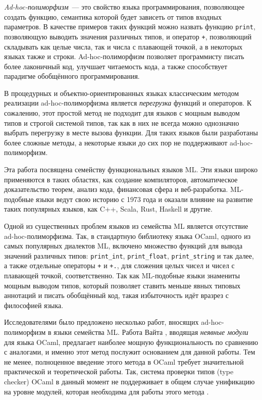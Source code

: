 \documentclass[../diploma.tex]{subfiles}
\begin{document}
 \label{sec:introduction}

\textit{Ad-hoc-полиморфизм}~--- это свойство языка программирования, позволяющее создать функцию, семантика которой будет зависеть от типов входных параметров. В качестве примеров таких функций можно назвать функцию \texttt{print}, позволяющую выводить значения различных типов, и оператор \texttt{+}, позволяющий складывать как целые числа, так и числа с плавающей точкой, а в некоторых языках также и строки. Ad-hoc-полиморфизм позволяет программисту писать более лаконичный код, улучшает читаемость кода, а также способствует парадигме обобщённого программирования.

В процедурных и объектно-ориентированных языках классическим методом реализации ad-hoc-полиморфизма является \textit{перегрузка} функций и операторов. К сожалению, этот простой метод не подходит для языков с мощным выводом типов и строгой системой типов, так как в них не всегда можно однозначно выбрать перегрузку в месте вызова функции. Для таких языков были разработаны более сложные методы, а некоторые языки до сих пор не поддерживают ad-hoc-полиморфизм.

Эта работа посвящена семейству функциональных языков ML. Эти языки широко применяются в таких областях, как создание компиляторов, автоматическое доказательство теорем, анализ кода, финансовая сфера и веб-разработка. ML-подобные языки ведут свою историю с 1973 года и оказали влияние на развитие таких популярных языков, как C++, Scala, Rust, Haskell и другие.

Одной из существенных проблем языков из семейства ML является отсутствие ad-hoc-полиморфизма. Так, в стандартную библиотеку языка OCaml, одного из самых популярных диалектов ML, включено множество функций для вывода значений различных типов: \texttt{print_int}, \texttt{print_float}, \texttt{print_string} и так далее, а также отдельные операторы \texttt{+} и \texttt{+.}, для сложения целых чисел и чисел с плавающей точкой, соответственно. Так как ML-подобные языки знамениты мощным выводом типов, который позволяет ставить меньше явных типовых аннотаций и писать обобщённый код, такая избыточность идёт вразрез с философией языка.

Исследователями было предложено несколько работ, вносящих ad-hoc-полиморфизм в языки семейства ML. Работа Вайта \cite{white}, вводящая \textit{неявные модули} для языка OCaml, предлагает наиболее мощную функциональность по сравнению с аналогами, и именно этот метод послужит основанием для данной работы. Тем не менее, полноценное введение этого метода в OCaml требует значительной практической и теоретической работы. Так, система проверки типов (type checker) OCaml в данный момент не поддерживает в общем случае унификацию на уровне модулей, которая необходима для работы этого метода \cite{discuss}.
\end{document}
